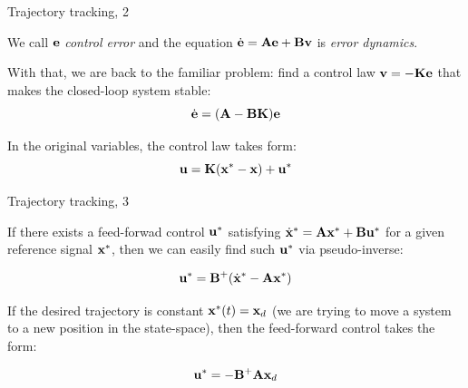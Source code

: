 \documentclass{beamer}
\begin{document}
\begin{frame}{Trajectory tracking, 2}
	\begin{flushleft}
		
		We call $\mathbf{e}$ \emph{control error} and the equation $\dot{\mathbf{e}} = \mathbf{A}\mathbf{e} + \mathbf{B}\mathbf{v}$ is \emph{error dynamics}.
		
		\bigskip
		
		With that, we are back to the familiar problem: find a control law $\mathbf{v} = -\mathbf{K}\mathbf{e}$ that makes the closed-loop system stable:
		\begin{equation}
			\dot{\mathbf{e}} = (\mathbf{A} - \mathbf{B}\mathbf{K}) \mathbf{e}
		\end{equation}
		
		In the original variables, the control law takes form:
		\begin{equation}
			\mathbf{u} = \mathbf{K}(\mathbf{x}^* - \mathbf{x}) + \mathbf{u}^*
		\end{equation}
		
	\end{flushleft}
\end{frame}




\begin{frame}{Trajectory tracking, 3}
	\begin{flushleft}
		
		If there exists a feed-forwad control $\mathbf{u}^*$ satisfying $\dot{\mathbf{x}}^* = \mathbf{A}\mathbf{x}^* + \mathbf{B}\mathbf{u}^*$ for a given reference signal $\mathbf{x}^*$, then we can easily find such $\mathbf{u}^*$  via pseudo-inverse:
		
		\begin{equation}
			 \mathbf{u}^* = \mathbf{B}^+(\dot{\mathbf{x}}^*  - \mathbf{A}\mathbf{x}^*)
		\end{equation}				
		
		If the desired trajectory is constant $\mathbf{x}^*(t) = \mathbf{x}_d$ (we are trying to move a system to a new position in the state-space), then the feed-forward control takes the form:
		
		\begin{equation}
			\mathbf{u}^* = -\mathbf{B}^+\mathbf{A}\mathbf{x}_d
		\end{equation}	
		
		
	\end{flushleft}
\end{frame}
\end{document}

